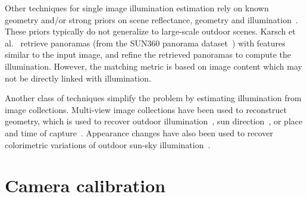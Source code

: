 Other techniques for single image illumination estimation rely on known geometry and/or strong priors on scene reflectance, geometry and illumination~\cite{barron-pami-15,barron2013rgbd,lombardi2016reflectance}. These priors typically do not generalize to large-scale outdoor scenes. Karsch et al.~\cite{karsch2014automatic} retrieve panoramas (from the SUN360 panorama dataset~\cite{xiao-cvpr-12}) with features similar to the input image, and refine the retrieved panoramas to compute the illumination. However, the matching metric is based on image content which may not be directly linked with illumination. 

Another class of techniques simplify the problem by estimating illumination from image collections. Multi-view image collections have been used to reconstruct geometry, which is used to recover outdoor illumination~\cite{haber2009relighting,lalonde-3dv-14,shan2015visual,duchene2015multiview}, sun direction~\cite{wehrwein2015shadows}, or place and time of capture~\cite{hauagge2014outdoor}. Appearance changes have also been used to recover colorimetric variations of outdoor sun-sky illumination~\cite{sunkavalli2008color}. 





\section{Camera calibration}

